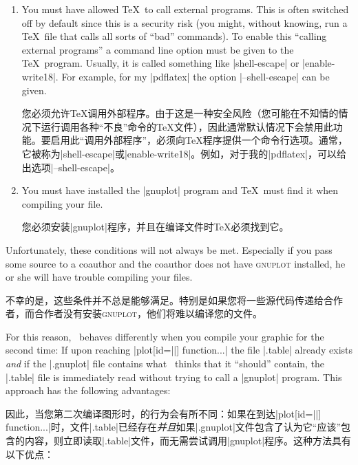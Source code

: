 %
\begin{enumerate}
    \item You must have allowed \TeX\ to call external programs. This is often
        switched off by default since this is a security risk (you might,
        without knowing, run a \TeX\ file that calls all sorts of ``bad''
        commands). To enable this ``calling external programs'' a command line
        option must be given to the \TeX\ program. Usually, it is called
        something like |shell-escape| or |enable-write18|. For example, for my
        |pdflatex| the option |--shell-escape| can be given.

        您必须允许\TeX 调用外部程序。由于这是一种安全风险（您可能在不知情的情况下运行调用各种“不良”命令的\TeX 文件），因此通常默认情况下会禁用此功能。要启用此“调用外部程序”，必须向\TeX 程序提供一个命令行选项。通常，它被称为|shell-escape|或|enable-write18|。例如，对于我的|pdflatex|，可以给出选项|--shell-escape|。

        \item You must have installed the |gnuplot| program and \TeX\ must find it
        when compiling your file.

        您必须安装|gnuplot|程序，并且在编译文件时\TeX 必须找到它。

    \end{enumerate}

Unfortunately, these conditions will not always be met. Especially if you pass
some source to a coauthor and the coauthor does not have \textsc{gnuplot}
installed, he or she will have trouble compiling your files.

不幸的是，这些条件并不总是能够满足。特别是如果您将一些源代码传递给合作者，而合作者没有安装\textsc{gnuplot}，他们将难以编译您的文件。

For this reason, \tikzname\ behaves differently when you compile your graphic
for the second time: If upon reaching |plot[id=||] function{...}| the
file |.table| already exists \emph{and} if the
|.gnuplot| file contains what \tikzname\ thinks that it
``should'' contain, the |.table| file is immediately read without trying to
call a |gnuplot| program. This approach has the following advantages:

因此，当您第二次编译图形时，\tikzname 的行为会有所不同：如果在到达|plot[id=||] function{...}|时，文件|.table|已经存在\emph{并且}如果|.gnuplot|文件包含了\tikzname 认为它“应该”包含的内容，则立即读取|.table|文件，而无需尝试调用|gnuplot|程序。这种方法具有以下优点：


